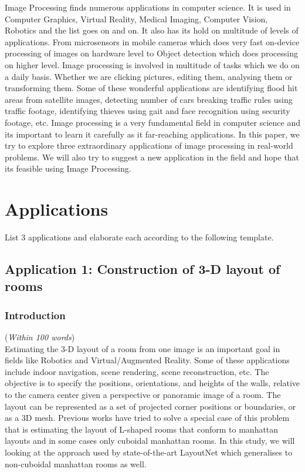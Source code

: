 \documentclass[11pt]{article}
\begin{document}
Image Processing finds numerous applications in computer science. It is used in Computer Graphics, Virtual Reality, Medical Imaging, Computer Vision, Robotics and the list goes on and on. It also has its hold on multitude of levels of applications. From microsensors in mobile cameras which does very fast on-device processing of images on hardware level to Object detection which does processing on higher level. Image processing is involved in multitude of tasks which we do on a daily basis. Whether we are clicking pictures, editing them, analysing them or transforming them. Some of these wonderful applications are identifying flood hit areas from satellite images, detecting number of cars breaking traffic rules using traffic footage, identifying thieves using gait and face recognition using security footage, etc. Image processing is a very fundamental field in computer science and its important to learn it carefully as it far-reaching applications. In this paper, we try to explore three extraordinary applications of image processing in real-world problems. We will also try to suggest a new application in the field and hope that its feasible using Image Processing.

\section{Applications}
List 3 applications and elaborate each according to the following template.

\subsection{Application 1: Construction of 3-D layout of rooms}


\subsubsection{Introduction} 
({\em Within 100 words}) \\

Estimating the 3-D layout of a room from one image is an important goal in fields like Robotics and Virtual/Augmented Reality. Some of these applications include indoor navigation, scene rendering, scene reconstruction, etc. The objective is to specify the positions, orientations, and heights of the walls, relative to the camera center given a perspective or panoramic image of a room. The layout can be represented as a set of projected corner positions or boundaries, or as a 3D mesh. Previous works have tried to solve a special case of this problem that is estimating the layout of L-shaped rooms that conform to manhattan layouts and in some cases only cuboidal manhattan rooms. In this study, we will looking at the approach used by state-of-the-art LayoutNet which generalises to non-cuboidal manhattan rooms as well.
\end{document}
